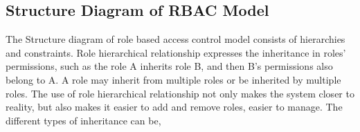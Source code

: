 \documentclass[12pt]{report}
\begin{document}
	\subsection{Structure Diagram of  RBAC Model}
		\hspace{6mm} The Structure diagram of role based access control model consists of hierarchies and constraints. Role hierarchical relationship expresses the inheritance in roles’ permissions, such as the role A inherits role B, and then B’s permissions also belong to A. A role may inherit from multiple roles or be inherited by multiple roles. The use of role hierarchical relationship not only makes the system closer to reality, but also makes it easier to add and remove roles, easier to manage. The different types of inheritance can be,\\
		
\end{document}
